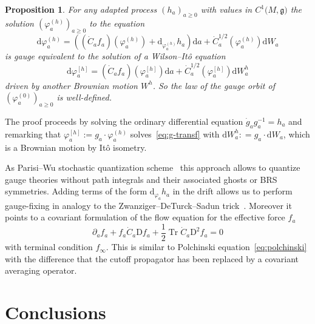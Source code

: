 \documentclass[reprint,aps]{revtex4-2}
\newcommand{\assign}{:=}
\newcommand{\cdummy}{\cdot}
\newcommand{\mathD}{\mathrm{D}}
\newcommand{\mathd}{\mathrm{d}}
\newcommand{\tmop}[1]{\ensuremath{\operatorname{#1}}}
\newtheorem{proposition}{Proposition}
\begin{document}
\begin{proposition}
  \label{LemGaugeAction}For any adapted process $(h_a)_{a \geqslant 0}$ with
  values in $C^1 (M, \mathfrak{g)}$ the solution $(\varphi^{(h)}_a)_{a
  \geqslant 0}$ to the equation
  \[ \mathd \varphi^{(h)}_a = ((\dot{C}_a f_a) (\varphi^{(h)}_a) +
     \mathd_{\varphi^{(h)}_a} h_a) \mathd a + \dot{C}_a^{1 / 2}
     (\varphi^{(h)}_a) \mathd W_a \]
  is gauge equivalent to the solution of a Wilson--It{\^o} equation
  \begin{equation}
    \mathd \varphi^{[h]}_a = (\dot{C}_a f_a) (\varphi^{[h]}_a) \mathd a +
    \dot{C}_a^{1 / 2} (\varphi^{[h]}_a) \mathd W^h_a \label{eq:g-transf}
  \end{equation}
  driven by another Brownian motion $W^h$. So the law of the gauge orbit of
  $(\varphi^{(0)}_a)_{a \geqslant 0}$ is well-defined.
\end{proposition}

The proof proceeds by solving the ordinary differential equation $\dot{g}_a
g_a^{- 1} = h_a$ and remarking that $\varphi^{[h]}_a \assign g_a \cdummy
\varphi^{(h) }_a$ solves~\eqref{eq:g-transf} with $\mathd W^h_a : = g_a \cdot
\mathd W_a$, which is a Brownian motion by It{\^o} isometry.

As Parisi--Wu stochastic quantization
scheme~{\cite{parisiPerturbationTheoryGauge1981}} this approach allows to
quantize gauge theories without path integrals and their associated ghosts or
BRS symmetries. Adding terms of the form $\mathd_{\varphi_a} h_a$ in the drift
allows us to perform gauge-fixing in analogy to the Zwanziger--DeTurck--Sadun
trick~{\cite{damgaardStochasticQuantization1988}}. Moreover it points to a
covariant formulation of the flow equation for the effective force $f_a$
\begin{equation}
  \partial_a f_a + f_a \dot{C}_a \mathD f_a + \frac{1}{2} \tmop{Tr} \dot{C}_a
  \mathD^2 f_a = 0 \label{eq:C-polchinski}
\end{equation}
with terminal condition $f_{\infty}$. This is similar to Polchinski
equation~\eqref{eq:polchinski} with the difference that the cutoff propagator
has been replaced by a covariant averaging operator.

\section{Conclusions}
\end{document}

